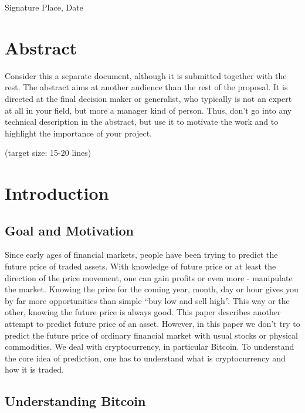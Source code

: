 \documentclass[a4paper,11pt,oneside]{article}
\begin{document}
  \vspace{20mm}

  Signature \hfill Place, Date

  \newpage

  \section*{Abstract}
  
  Consider this a separate document, although it is submitted together
  with the rest. The abstract aims at another audience than the rest
  of the proposal. It is directed at the final decision maker or
  generalist, who typically is not an expert at all in your field, but
  more a manager kind of person. Thus, don't go into any technical
  description in the abstract, but use it to motivate the work and to
  highlight the importance of your project.

  (target size: 15-20 lines)

  \newpage
  \tableofcontents

  \clearpage

  \section{Introduction}
  
  \subsection{Goal and Motivation}

  Since early ages of financial markets, people have been trying to predict the future price of traded assets. With knowledge of future price or at least the direction of the price movement, one can gain profits or even more - manipulate the market. Knowing the price for the coming year, month, day or hour gives you by far more opportunities than simple “buy low and sell high”. This way or the other, knowing the future price is always good. This paper describes another attempt to predict future price of an asset. However, in this paper we don’t try to predict the future price of ordinary financial market with usual stocks or physical commodities. We deal with cryptocurrency, in particular Bitcoin. To understand the core idea of prediction, one has to understand what is cryptocurrency and how it is traded.
 
  \subsection{Understanding Bitcoin}
  
\end{document}
